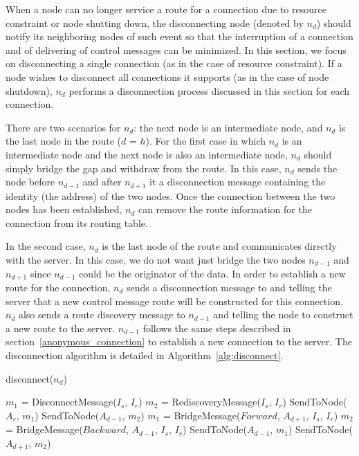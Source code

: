 When a node can no longer service a route for a connection due to
resource constraint or node shutting down, the disconnecting node
(denoted by $n_d$) should notify its neighboring nodes of such
event so that the interruption of a connection and of delivering
of control messages can be minimized. In this section, we focus on
disconnecting a single connection (as in the case of resource
constraint). If a node wishes to disconnect all connections it
supports (as in the case of node shutdown), $n_d$ performs a
disconnection process discussed in this section for each
connection.

There are two scenarios for $n_d$: the next node is an
intermediate node, and $n_d$ is the last node in the route ($d$ =
$h$). For the first case in which $n_d$ is an intermediate node
and the next node is also an intermediate node, $n_d$ should
simply bridge the gap and withdraw from the route. In this case,
$n_d$ sends the node before $n_{d-1}$ and after $n_{d+1}$ it a
disconnection message containing the identity (the address) of the
two nodes. Once the connection between the two nodes has been
established, $n_d$ can remove the route information for the
connection from its routing table.

In the second case, $n_d$ is the last node of the route and
communicates directly with the server. In this case, we do not
want just bridge the two nodes $n_{d-1}$ and $n_{d+1}$ since
$n_{d-1}$ could be the originator of the data. In order to
establish a new route for the connection, $n_d$ sends a
disconnection message to and telling the server that a new control
message route will be constructed for this connection. $n_d$ also
sends a route discovery message to $n_{d-1}$ and telling the node
to construct a new route to the server. $n_{d-1}$ follows the same
steps described in section~\ref{anonymous_connection} to establish
a new connection to the server. The disconnection algorithm is
detailed in Algorithm~\ref{alg:disconnect}.

\begin{algorithm}
 \caption{disconnect($n_d$)}
\label{alg:disconnect}
\begin{algorithmic}[1]
    \STATE $m_1$ = DisconnectMessage($I_s$, $I_r$)
    \STATE $m_2$ = RediscoveryMessage($I_s$, $I_r$)
    \STATE SendToNode($A_r$, $m_1$)
    \STATE SendToNode($A_{d-1}$, $m_2$)
\ELSE
    \STATE $m_1$ = BridgeMessage($Forward$, $A_{d+1}$, $I_s$, $I_r$)
    \STATE $m_2$ = BridgeMessage($Backward$, $A_{d-1}$, $I_s$, $I_r$)
    \STATE SendToNode($A_{d-1}$, $m_1$)
    \STATE SendToNode($A_{d+1}$, $m_2$)
\ENDIF
\end{algorithmic}
\end{algorithm}

